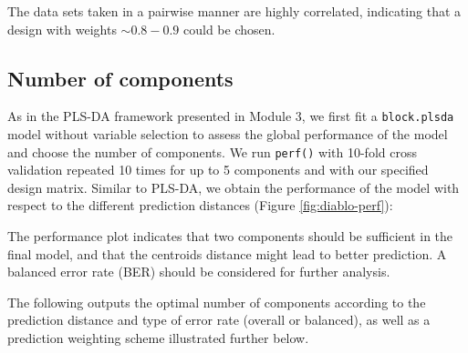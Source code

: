 \documentclass[
]{book}
\newenvironment{Shaded}{\begin{snugshade}}{\end{snugshade}}
\newcommand{\AttributeTok}[1]{\textcolor[rgb]{0.77,0.63,0.00}{#1}}
\newcommand{\CommentTok}[1]{\textcolor[rgb]{0.56,0.35,0.01}{\textit{#1}}}
\newcommand{\DecValTok}[1]{\textcolor[rgb]{0.00,0.00,0.81}{#1}}
\newcommand{\FunctionTok}[1]{\textcolor[rgb]{0.00,0.00,0.00}{#1}}
\newcommand{\NormalTok}[1]{#1}
\newcommand{\OtherTok}[1]{\textcolor[rgb]{0.56,0.35,0.01}{#1}}
\newcommand{\StringTok}[1]{\textcolor[rgb]{0.31,0.60,0.02}{#1}}
\begin{document}
The data sets taken in a pairwise manner are highly correlated, indicating that a design with weights \(\sim 0.8 - 0.9\) could be chosen.

\hypertarget{number-of-components}{%
\subsection{Number of components}\label{number-of-components}}

As in the PLS-DA framework presented in Module 3, we first fit a \texttt{block.plsda} model without variable selection to assess the global performance of the model and choose the number of components. We run \texttt{perf()} with 10-fold cross validation repeated 10 times for up to 5 components and with our specified design matrix. Similar to PLS-DA, we obtain the performance of the model with respect to the different prediction distances (Figure \ref{fig:diablo-perf}):

\begin{Shaded}
\end{Shaded}



The performance plot indicates that two components should be sufficient in the final model, and that the centroids distance might lead to better prediction. A balanced error rate (BER) should be considered for further analysis.

The following outputs the optimal number of components according to the prediction distance and type of error rate (overall or balanced), as well as a prediction weighting scheme illustrated further below.
\end{document}

